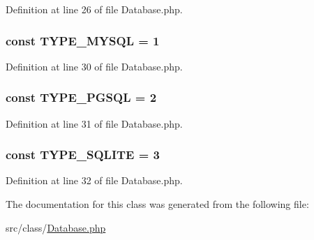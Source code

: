 Definition at line 26 of file Database.\+php.

\hypertarget{class_database_ab93424c90d1a3c44eb13221df4a4f773}{}
\subsubsection[{T\+Y\+P\+E\+\_\+\+M\+Y\+S\+Q\+L}]{\setlength{\rightskip}{0pt plus 5cm}const T\+Y\+P\+E\+\_\+\+M\+Y\+S\+Q\+L = 1}\label{class_database_ab93424c90d1a3c44eb13221df4a4f773}


Definition at line 30 of file Database.\+php.

\hypertarget{class_database_a50a87e8333b1ab093dbeecda41fe4335}{}
\subsubsection[{T\+Y\+P\+E\+\_\+\+P\+G\+S\+Q\+L}]{\setlength{\rightskip}{0pt plus 5cm}const T\+Y\+P\+E\+\_\+\+P\+G\+S\+Q\+L = 2}\label{class_database_a50a87e8333b1ab093dbeecda41fe4335}


Definition at line 31 of file Database.\+php.

\hypertarget{class_database_ad651a8cde87b429d4335e15dd6551ca9}{}
\subsubsection[{T\+Y\+P\+E\+\_\+\+S\+Q\+L\+I\+T\+E}]{\setlength{\rightskip}{0pt plus 5cm}const T\+Y\+P\+E\+\_\+\+S\+Q\+L\+I\+T\+E = 3}\label{class_database_ad651a8cde87b429d4335e15dd6551ca9}


Definition at line 32 of file Database.\+php.



The documentation for this class was generated from the following file\+:\begin{DoxyCompactItemize}
\item 
src/class/\hyperlink{_database_8php}{Database.\+php}\end{DoxyCompactItemize}
